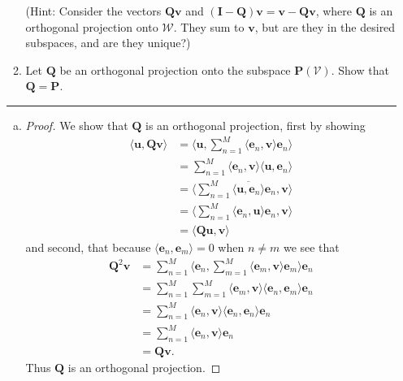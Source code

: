 \documentclass[12pt]{amsart}
\newcommand{\1}{\mathbbm{1}}
\numberwithin{equation}{section}
\numberwithin{Theorem}{section}
\theoremstyle{plain} %
\theoremstyle{definition}
\theoremstyle{remark}
\begin{document}
\begin{enumerate}[1.]
\begin{enumerate}
(Hint: Consider the vectors \(\mathbf{Qv}\) and \((\mathbf{I}-\mathbf{Q})\mathbf{v} = \mathbf{v} -\mathbf{Qv}\), where \(\mathbf{Q}\) is an orthogonal projection onto \(\mathcal{W}\). They sum to \(\mathbf{v}\), but are they in the desired subspaces, and are they unique?)\bigskip

\item Let \(\mathbf{Q}\) be an orthogonal projection onto the subspace \(\mathbf{P}(\mathcal{V})\). Show that \(\mathbf{Q}=\mathbf{P}\).\bigskip

\end{enumerate}

\hrule \bigskip

\begin{enumerate}[(a)]
	\addtocounter{enumii}{3}
	\item 
	\begin{proof}
		We show that \(\mathbf{Q}\) is an orthogonal projection, first by showing
		\begin{align*}
			\langle \mathbf{u}, \mathbf{Q}\mathbf{v} \rangle
			&= \langle \mathbf{u}, \sum_{n=1}^{M} \langle \mathbf{e}_n, \mathbf{v} \rangle \mathbf{e}_n \rangle \\
			&= \sum_{n=1}^{M} \langle \mathbf{e}_n, \mathbf{v} \rangle \langle \mathbf{u}, \mathbf{e}_n \rangle \\
			&=  \langle \sum_{n=1}^{M}\overline{\langle \mathbf{u}, \mathbf{e}_n \rangle} \mathbf{e}_n, \mathbf{v} \rangle \\
			&= \langle \sum_{n=1}^{M}\langle \mathbf{e}_n, \mathbf{u} \rangle \mathbf{e}_n, \mathbf{v} \rangle \\
			&= \langle \mathbf{Q} \mathbf{u}, \mathbf{v} \rangle
		\end{align*}
		and second, that because 
		\(\langle \mathbf{e}_n, \mathbf{e}_m \rangle = 0\)
		when \(n\neq m\) we see that
		\begin{align*}
			\mathbf{Q}^2\mathbf{v}
			&= \sum_{n=1}^{M} \langle \mathbf{e}_n, \sum_{m=1}^{M} \langle \mathbf{e}_m, \mathbf{v} \rangle \mathbf{e}_m \rangle \mathbf{e}_n \\
			&= \sum_{n=1}^{M} \sum_{m=1}^{M} \langle \mathbf{e}_m, \mathbf{v} \rangle \langle \mathbf{e}_n,  \mathbf{e}_m \rangle \mathbf{e}_n \\
			&= \sum_{n=1}^{M} \langle \mathbf{e}_n, \mathbf{v} \rangle \langle \mathbf{e}_n, \mathbf{e}_n \rangle \mathbf{e}_n \\
			&= \sum_{n=1}^{M} \langle \mathbf{e}_n, \mathbf{v} \rangle \mathbf{e}_n \\
			&= \mathbf{Q}\mathbf{v}.
		\end{align*}
		Thus $\mathbf{Q}$ is an orthogonal projection.
		

\end{proof}
\end{enumerate}
\end{enumerate}
\end{document}
